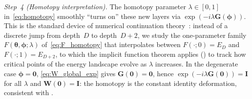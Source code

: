 \documentclass[11pt]{article}
\theoremstyle{plain}
\theoremstyle{plain}
\begin{document}
\emph{Step~4 (Homotopy interpretation).}
The homotopy parameter $\lambda\in[0,1]$ in~\eqref{eq:homotopy}
smoothly ``turns on'' these new layers via
$\exp(-i\lambda\mathbf{G}(\bm\phi))$.  This is the standard device of
numerical continuation theory~\cite{allgower2003introduction}: instead
of a discrete jump from depth~$D$ to depth~$D{+}2$, we study the
one-parameter family $F(\bm\theta,\bm\phi;\lambda)$
of~\eqref{eq:F_homotopy} that interpolates between
$F(\cdot;0)=E_D$ and $F(\cdot;1)=E_{D+2}$, to which the implicit
function theorem applies () to track
how critical points of the energy landscape evolve as $\lambda$
increases.  In the degenerate case $\bm\phi=\bm0$, \eqref{eq:W_global_exp}
gives $\mathbf{G}(\bm0)=\mathbf{0}$, hence $\exp(-i\lambda\mathbf{G}(\bm0))=\mathbf{I}$ for all
$\lambda$ and $\mathbf{W}(\bm0)=\mathbf{I}$: the homotopy is the constant identity
deformation, consistent with .
\end{document}
